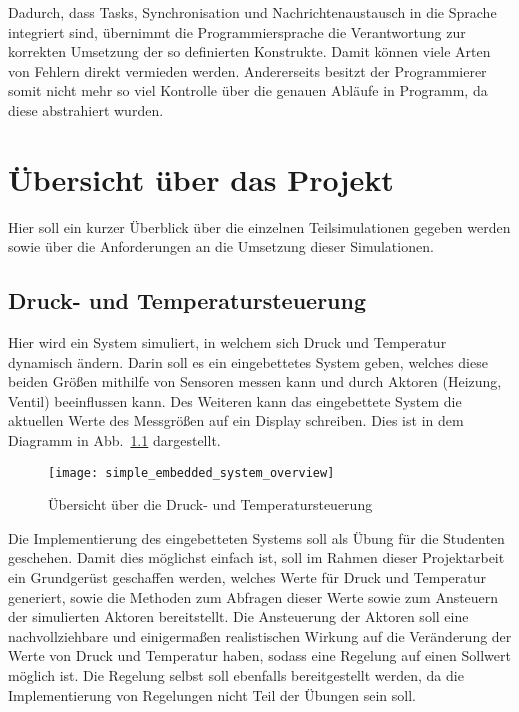\documentclass[oneside]{elaboration}
\begin{document}
Dadurch, dass Tasks, Synchronisation und Nachrichtenaustausch in die Sprache
integriert sind, übernimmt die Programmiersprache die Verantwortung zur
korrekten Umsetzung der so definierten Konstrukte. Damit können viele Arten von
Fehlern direkt vermieden werden. Andererseits besitzt der Programmierer somit
nicht mehr so viel Kontrolle über die genauen Abläufe in Programm, da diese
abstrahiert wurden.

\chapter{Übersicht über das Projekt}
\label{chp:uebersicht_ueber_das_projekt}

Hier soll ein kurzer Überblick über die einzelnen Teilsimulationen gegeben
werden sowie über die Anforderungen an die Umsetzung dieser Simulationen.

\section{Druck- und Temperatursteuerung}
\label{sec:druck-_und_temperatursteuerung}

Hier wird ein System simuliert, in welchem sich Druck und Temperatur dynamisch
ändern. Darin soll es ein eingebettetes System geben, welches diese beiden
Größen mithilfe von Sensoren messen kann und durch Aktoren (Heizung, Ventil)
beeinflussen kann. Des Weiteren kann das eingebettete System die aktuellen Werte
des Messgrößen auf ein Display schreiben. Dies ist in dem Diagramm in
Abb.~\ref{fig:simple_embedded_system_overview} dargestellt.

\begin{figure}[hbt]
\centering
\texttt{[image: simple\_embedded\_system\_overview]}
\caption{Übersicht über die Druck- und Temperatursteuerung}
\label{fig:simple_embedded_system_overview}
\end{figure}

Die Implementierung des eingebetteten Systems soll als Übung für die Studenten
geschehen. Damit dies möglichst einfach ist, soll im Rahmen dieser Projektarbeit
ein Grundgerüst geschaffen werden, welches Werte für Druck und Temperatur
generiert, sowie die Methoden zum Abfragen dieser Werte sowie zum Ansteuern der
simulierten Aktoren bereitstellt. Die Ansteuerung der Aktoren soll eine
nachvollziehbare und einigermaßen realistischen Wirkung auf die Veränderung der
Werte von Druck und Temperatur haben, sodass eine Regelung auf einen Sollwert
möglich ist. Die Regelung selbst soll ebenfalls bereitgestellt werden, da die
Implementierung von Regelungen nicht Teil der Übungen sein soll.
\end{document}
